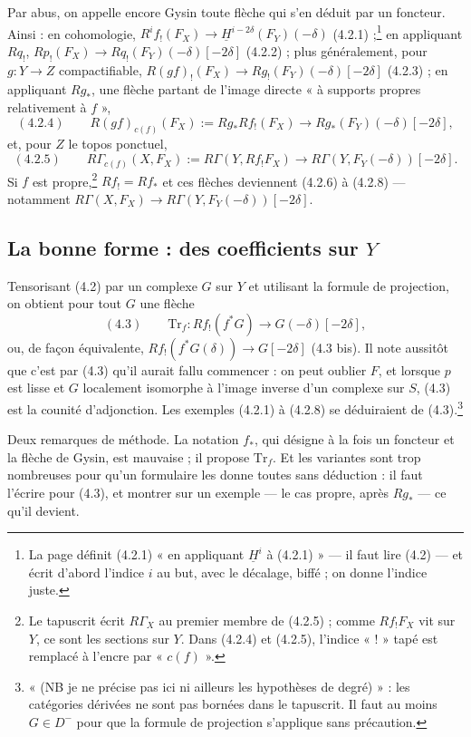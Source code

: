 \documentclass[11pt,a4paper]{article}
\begin{document}
Par abus, on appelle encore Gysin toute flèche qui s'en déduit par un
foncteur. Ainsi : en cohomologie, $R^if_!(F_X) \to
\underline{H}^{i-2\delta}(F_Y)(-\delta)$ (4.2.1) ;\footnote{La page définit
(4.2.1) « en appliquant $\underline{H}^i$ à (4.2.1) » --- il faut lire (4.2)
--- et écrit d'abord l'indice $i$ au but, avec le décalage, biffé ; on donne
l'indice juste.} en appliquant $Rq_!$, $Rp_!(F_X) \to
Rq_!(F_Y)(-\delta)[-2\delta]$ (4.2.2) ; plus généralement, pour $g\colon Y
\to Z$ compactifiable, $R(gf)_!(F_X) \to Rg_!(F_Y)(-\delta)[-2\delta]$
(4.2.3) ; en appliquant $Rg_*$, une flèche partant de l'image directe « à
supports propres relativement à $f$ »,
\[
(4.2.4)\qquad R(gf)_{c(f)}(F_X) := Rg_*Rf_!(F_X) \longrightarrow
Rg_*(F_Y)(-\delta)[-2\delta],
\]
et, pour $Z$ le topos ponctuel,
\[
(4.2.5)\qquad R\Gamma_{c(f)}(X, F_X) := R\Gamma(Y, Rf_!F_X) \longrightarrow
R\Gamma(Y, F_Y(-\delta))[-2\delta].
\]
Si $f$ est propre,\footnote{Le tapuscrit écrit $R\Gamma_X$ au premier membre de
(4.2.5) ; comme $Rf_!F_X$ vit sur $Y$, ce sont les sections sur $Y$. Dans
(4.2.4) et (4.2.5), l'indice « $!$ » tapé est remplacé à l'encre par
« $c(f)$ ».} $Rf_! = Rf_*$ et ces flèches deviennent (4.2.6) à (4.2.8)
--- notamment $R\Gamma(X, F_X) \to R\Gamma(Y, F_Y(-\delta))[-2\delta]$.

\subsection*{La bonne forme : des coefficients sur $Y$}

Tensorisant (4.2) par un complexe $G$ sur $Y$ et utilisant la formule de
projection, on obtient pour tout $G$ une flèche
\[
(4.3)\qquad \mathrm{Tr}_f\colon Rf_!(f^*G) \longrightarrow G(-\delta)[-2\delta],
\]
ou, de façon équivalente, $Rf_!(f^*G(\delta)) \to G[-2\delta]$ (4.3 bis). Il
note aussitôt que c'est par (4.3) qu'il aurait fallu commencer : on peut
oublier $F$, et lorsque $p$ est lisse et $G$ localement isomorphe à l'image
inverse d'un complexe sur $S$, (4.3) est la counité d'adjonction. Les exemples
(4.2.1) à (4.2.8) se déduiraient de (4.3).\footnote{« (NB je ne précise pas
ici ni ailleurs les hypothèses de degré) » : les catégories dérivées ne sont
pas bornées dans le tapuscrit. Il faut au moins $G \in D^-$ pour que la
formule de projection s'applique sans précaution.}

Deux remarques de méthode. La notation $f_*$, qui désigne à la fois un
foncteur et la flèche de Gysin, est mauvaise ; il propose $\mathrm{Tr}_f$.
Et les variantes sont trop nombreuses pour qu'un formulaire les donne toutes
sans déduction : il faut l'écrire pour (4.3), et montrer sur un exemple --- le
cas propre, après $Rg_*$ --- ce qu'il devient.
\end{document}
